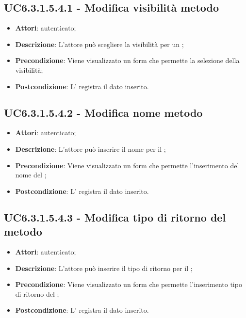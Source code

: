 \subsection{UC6.3.1.5.4.1 - Modifica visibilità metodo}
\label{ssec:UC6.3.1.5.4.1}
\begin{itemize}
\item \textbf{Attori}:  autenticato;
\item \textbf{Descrizione}: L'attore può scegliere la visibilità per un ;
\item \textbf{Precondizione}: Viene visualizzato un form che permette la selezione della visibilità;
\item \textbf{Postcondizione}: L' registra il dato inserito.
\end{itemize}
\subsection{UC6.3.1.5.4.2 - Modifica nome metodo}
\label{ssec:UC6.3.1.5.4.2}
\begin{itemize}
\item \textbf{Attori}:  autenticato;
\item \textbf{Descrizione}: L'attore può inserire il nome per il ;
\item \textbf{Precondizione}: Viene visualizzato un form che permette l'inserimento del nome del ;
\item \textbf{Postcondizione}: L' registra il dato inserito.
\end{itemize}
\subsection{UC6.3.1.5.4.3 - Modifica tipo di ritorno del metodo}
\label{ssec:UC6.3.1.5.4.3}
\begin{itemize}
\item \textbf{Attori}:  autenticato;
\item \textbf{Descrizione}: L'attore può inserire il tipo di ritorno per il ;
\item \textbf{Precondizione}: Viene visualizzato un form che permette l'inserimento tipo di ritorno del ;
\item \textbf{Postcondizione}: L' registra il dato inserito.
\end{itemize}
